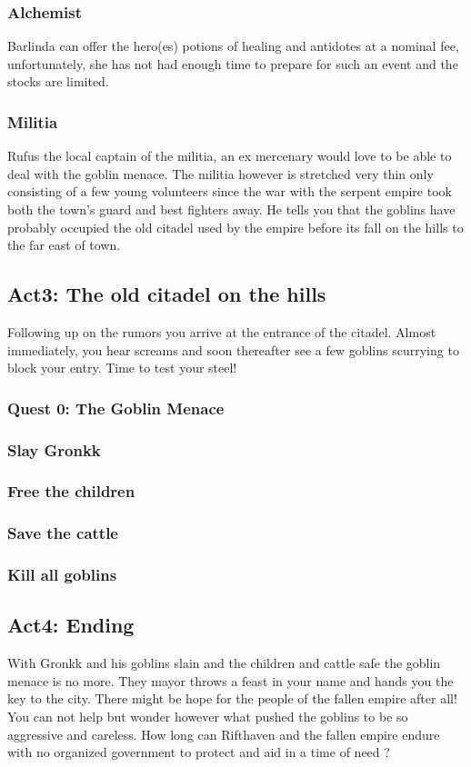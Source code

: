 \documentclass[11pt]{article}
\begin{document}
\subsubsection*{Alchemist}
\label{sec:orge4e5ae5}
Barlinda can offer the hero(es) potions of healing and antidotes at a nominal fee, unfortunately,
she has not had enough time to prepare for such an event and the stocks are limited.

\subsubsection*{Militia}
\label{sec:orgfdbf014}
Rufus the local captain of the militia, an ex mercenary would love to be able to deal with the goblin menace.
The militia however is stretched very thin only consisting of a few young volunteers since the war with
the serpent empire took both the town's guard and best fighters away. He tells you that the goblins 
have probably occupied the old citadel used by the empire before its fall on the hills to the far east of town.

\subsection*{Act3: The old citadel on the hills}
\label{sec:orgc2fe549}
Following up on the rumors you arrive at the entrance of the citadel. Almost immediately, you hear screams and
soon thereafter see a few goblins scurrying to block your entry. Time to test your steel!

\subsubsection*{Quest 0: The Goblin Menace}
\label{sec:org9cd9cd1}
\subsubsection*{Slay Gronkk}
\label{sec:orgbdc615a}
\subsubsection*{Free the children}
\label{sec:orgd86ffb6}
\subsubsection*{Save the cattle}
\label{sec:org337dbb6}
\subsubsection*{Kill all goblins}
\label{sec:org9faad5c}


\subsection*{Act4: Ending}
\label{sec:org15d0f04}
With Gronkk and his goblins slain and the children and cattle safe the goblin menace is no more.
They mayor throws a feast in your name and hands you the key to the city. 
There might be hope for the people of the fallen empire after all!
You can not help but wonder however what pushed the goblins to be so aggressive and careless. 
How long can Rifthaven and the fallen empire endure with no organized government to protect and aid 
in a time of need ?
\end{document}
